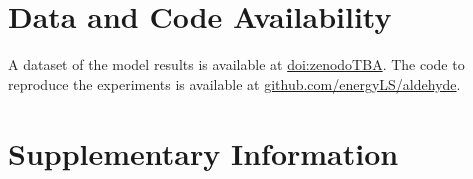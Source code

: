 \documentclass[5p]{elsarticle}
\begin{document}




\section*{Data and Code Availability}

A dataset of the model results is available at \href{zenodoTBA}{doi:zenodoTBA}.
The code to reproduce the experiments is available at \href{https://github.com/energyLS/aldehyde}{github.com/energyLS/aldehyde}.

\renewcommand{\ttdefault}{\sfdefault}



\newpage
\onecolumn

\makeatletter
\renewcommand \thesection{S\@arabic\c@section}
\renewcommand\thetable{S\@arabic\c@table}
\renewcommand \thefigure{S\@arabic\c@figure}
\makeatother
\renewcommand{\citenumfont}[1]{S#1}
\setcounter{equation}{0}
\setcounter{figure}{0}
\setcounter{table}{0}
\setcounter{section}{0}


\section*{Supplementary Information}
\label{sec:si}













\renewcommand{\ttdefault}{\sfdefault}
\end{document}
